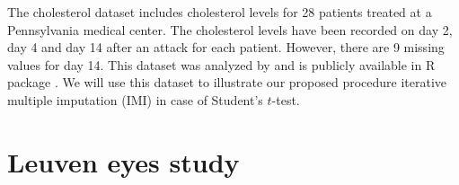 \documentclass[11pt,a5paper,twoside]{book}
\begin{document}
The cholesterol dataset includes cholesterol levels for 28 patients treated at a Pennsylvania medical center. The cholesterol levels have been recorded on day 2, day 4 and day 14 after an attack for each patient. However, there are 9 missing values for day 14. This dataset was analyzed by \citet[Chapter 5]{schafer1997} and is publicly available in \textsc{R} package {}. We will use this dataset to illustrate our proposed procedure iterative multiple imputation (IMI) in case of Student's $t$-test. 

%
%

\section{Leuven eyes study} 
\end{document}

